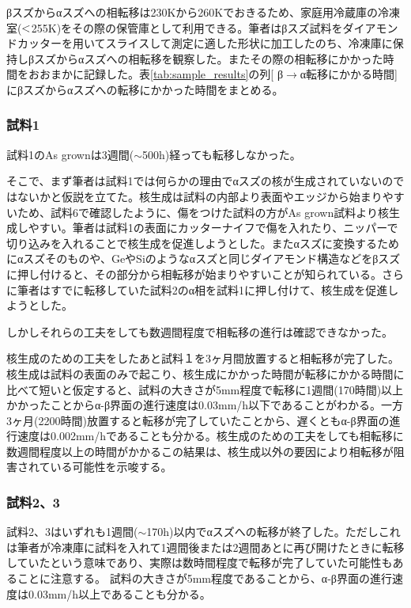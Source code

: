 βスズからαスズへの相転移は230Kから260Kでおきる\cite{Matvienko,Nogita,Cornelius}ため、家庭用冷蔵庫の冷凍室($\rm<$255K)をその際の保管庫として利用できる。筆者はβスズ試料をダイアモンドカッターを用いてスライスして測定に適した形状に加工したのち、冷凍庫に保持しβスズからαスズへの相転移を観察した。またその際の相転移にかかった時間をおおまかに記録した。表\ref{tab:sample_results}の列[ β$\to$α転移にかかる時間] にβスズからαスズへの転移にかかった時間をまとめる。

\subsubsection{試料1}
試料1のAs grownは3週間($\sim$500h)経っても転移しなかった。

そこで、まず筆者は試料1では何らかの理由でαスズの核が生成されていないのではないかと仮説を立てた。核生成は試料の内部より表面やエッジから始まりやすい\cite{Cornelius}ため、試料6で確認したように、傷をつけた試料の方がAs grown試料より核生成しやすい。筆者は試料1の表面にカッターナイフで傷を入れたり、ニッパーで切り込みを入れることで核生成を促進しようとした。またαスズに変換するためにαスズそのものや、GeやSiのようなαスズと同じダイアモンド構造などをβスズに押し付けると、その部分から相転移が始まりやすいことが知られている\cite{Cornelius}。さらに筆者はすでに転移していた試料2のα相を試料1に押し付けて、核生成を促進しようとした。

しかしそれらの工夫をしても数週間程度で相転移の進行は確認できなかった。

核生成のための工夫をしたあと試料１を3ヶ月間放置すると相転移が完了した。核生成は試料の表面のみで起こり、核生成にかかった時間が転移にかかる時間に比べて短いと仮定すると、試料の大きさが5mm程度で転移に1週間(170時間)以上かかったことからα-β界面の進行速度は0.03mm/h以下であることがわかる。一方3ヶ月(2200時間)放置すると転移が完了していたことから、遅くともα-β界面の進行速度は0.002mm/hであることも分かる。核生成のための工夫をしても相転移に数週間程度以上の時間がかかるこの結果は、核生成以外の要因により相転移が阻害されている可能性を示唆する。

\subsubsection{試料2、3}
試料2、3はいずれも1週間($\sim$170h)以内でαスズへの転移が終了した。ただしこれは筆者が冷凍庫に試料を入れて1週間後または2週間あとに再び開けたときに転移していたという意味であり、実際は数時間程度で転移が完了していた可能性もあることに注意する。
試料の大きさが5mm程度であることから、α-β界面の進行速度は0.03mm/h以上であることも分かる。


